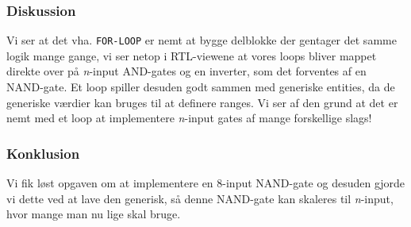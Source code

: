 {    
        





    \subsubsection{Diskussion}

    Vi ser at det vha. \texttt{FOR-LOOP} er nemt at bygge delblokke der gentager det samme logik mange gange, vi ser netop i RTL-viewene at vores loops bliver mappet direkte over på \textit{n}-input AND-gates og en inverter, som det forventes af en NAND-gate.
    Et loop spiller desuden godt sammen med generiske entities, da de generiske værdier kan bruges til at definere ranges.
    Vi ser af den grund at det er nemt med et loop at implementere \textit{n}-input gates af mange forskellige slags!

    \subsubsection{Konklusion}

    Vi fik løst opgaven om at implementere en 8-input NAND-gate og desuden gjorde vi dette ved at lave den generisk, så denne NAND-gate kan skaleres til \textit{n}-input, hvor mange man nu lige skal bruge.
}